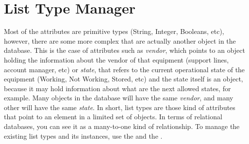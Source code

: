 \documentclass[a4paper]{article}
\begin{document}
	\clearpage
	\section{List Type Manager} \label{sec:list_type_manager}
	Most of the attributes are primitive types (String, Integer, Booleans, etc), however, there are some more complex that are actually another object in the database. This is the case of attributes such as \textit{vendor}, which points to an object holding the information about the vendor of that equipment (support lines, account manager, etc) or \textit{state}, that refers to the current operational state of the equipment (Working, Not Working, Stored, etc) and the state itself is an object, because it may hold information about what are the next allowed states, for example. Many objects in the database will have the same \textit{vendor}, and many other will have the same \textit{state}. In short, list types are those kind of attributes that point to an element in a limited set of objects. In terms of relational databases, you can see it as a many-to-one kind of relationship. To manage the existing list types and its instances, use the \textbf{} and the \textbf{}. \newline
	
\end{document}
